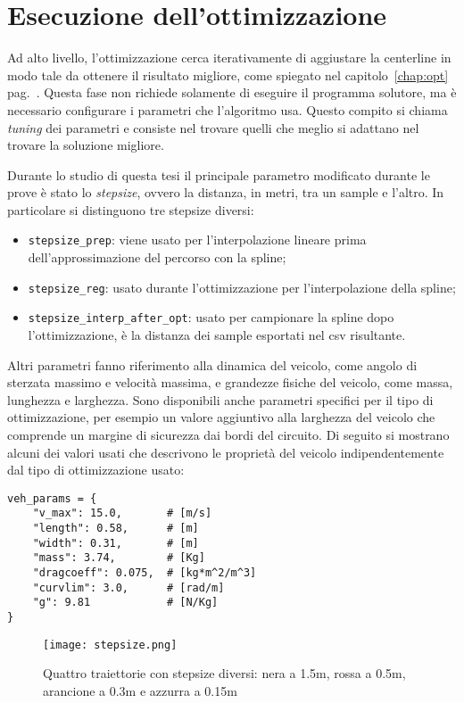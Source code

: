 \newpage


\section{Esecuzione dell'ottimizzazione}
Ad alto livello, l'ottimizzazione cerca iterativamente di aggiustare la centerline in modo tale da
ottenere il risultato migliore, come spiegato nel capitolo~\ref{chap:opt} pag.~\pageref{chap:opt}.
Questa fase non richiede solamente di eseguire il programma solutore, ma è necessario
configurare i parametri che l'algoritmo usa. Questo compito si chiama \textit{tuning} dei parametri
e consiste nel trovare quelli che meglio si adattano nel trovare la soluzione migliore.

Durante lo studio di questa tesi il principale parametro modificato durante le prove è stato lo
\textit{stepsize}, ovvero la distanza, in metri, tra un sample e l'altro. In particolare si distinguono
tre stepsize diversi:
\begin{itemize}
	\item \verb|stepsize_prep|: viene usato per l'interpolazione lineare prima dell'approssimazione del
		percorso con la spline;
	\item \verb|stepsize_reg|: usato durante l'ottimizzazione per l'interpolazione della spline;
	\item \verb|stepsize_interp_after_opt|: usato per campionare la spline dopo l'ottimizzazione, è la
		distanza dei sample esportati nel csv risultante.
\end{itemize}
Altri parametri fanno riferimento alla dinamica del veicolo, come angolo di sterzata massimo e velocità
massima, e grandezze fisiche del veicolo, come massa, lunghezza e larghezza. Sono disponibili anche
parametri specifici per il tipo di ottimizzazione, per esempio un valore aggiuntivo alla larghezza del
veicolo che comprende un margine di sicurezza dai bordi del circuito. Di seguito si mostrano alcuni dei
valori usati che descrivono le proprietà del veicolo indipendentemente dal tipo di ottimizzazione usato:

\begin{lstlisting}
veh_params = {
	"v_max": 15.0,       # [m/s]
	"length": 0.58,      # [m]
	"width": 0.31,       # [m]
	"mass": 3.74,        # [Kg]
	"dragcoeff": 0.075,  # [kg*m^2/m^3]
	"curvlim": 3.0,      # [rad/m]
	"g": 9.81            # [N/Kg]
}
\end{lstlisting}

\begin{figure}[H]
	\begin{center}
		\texttt{[image: stepsize.png]}
	\end{center}
	\caption{Quattro traiettorie con stepsize diversi: nera a 1.5m, rossa a 0.5m,
	arancione a 0.3m e azzurra a 0.15m}
	\label{fig:stepsize}
\end{figure}

